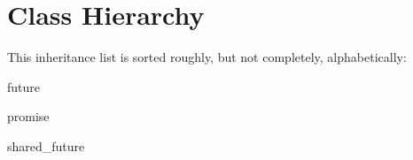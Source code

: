 \section{Class Hierarchy}
This inheritance list is sorted roughly, but not completely, alphabetically\+:\begin{DoxyCompactList}
\item future\begin{DoxyCompactList}
\item {}
\end{DoxyCompactList}
\item promise\begin{DoxyCompactList}
\item {}
\end{DoxyCompactList}
\item shared\+\_\+future\begin{DoxyCompactList}
\item {}
\end{DoxyCompactList}
\end{DoxyCompactList}
